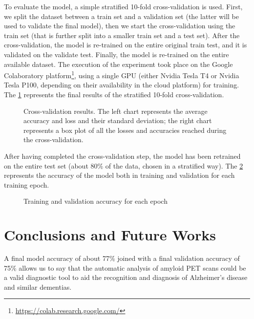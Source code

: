 \documentclass[10pt,twocolumn,letterpaper]{article}
\begin{document}
To evaluate the model, a simple stratified 10-fold cross-validation is used.
First, we split the dataset between a train set and a validation set (the latter
will be used to validate the final model), then we start the cross-validation
using the train set (that is further split into a smaller train set and a test
set). After the cross-validation, the model is re-trained on the entire original
train test, and it is validated on the validate test. Finally, the model is
re-trained on the entire available dataset. The execution of the experiment took
place on the Google Colaboratory
platform\footnote{\url{https://colab.research.google.com/}}, using a single GPU
(either Nvidia Tesla T4 or Nvidia Tesla P100, depending on their availability in
the cloud platform) for training. The \cref{fig:cv-results} represents the final
results of the stratified 10-fold cross-validation.

\begin{figure}[h]
  \centering
  \resizebox{\linewidth}{!}{%
    
  }
  \caption[Cross-validation results]{Cross-validation results. The left chart represents the average accuracy and loss and their standard deviation; the right chart represents a box plot of all the losses and accuracies reached during the cross-validation.}
  \label{fig:cv-results}
\end{figure}

After having completed the cross-validation step, the model has been retrained on the entire test set (about 80\% of the data, chosen in a stratified way). The \cref{fig:validation-accuracy} represents the accuracy of the model both in training and validation for each training epoch.

\begin{figure}[h]
  \centering
  \resizebox{\linewidth}{!}{%
    
  }
  \caption{Training and validation accuracy for each epoch}
  \label{fig:validation-accuracy}
\end{figure}

\section{Conclusions and Future Works}
\label{sec:conclusions}

A final model accuracy of about 77\% joined with a final validation accuracy of
75\% allows us to say that the automatic analysis of amyloid PET scans could be
a valid diagnostic tool to aid the recognition and diagnosis of Alzheimer's
disease and similar dementias.
\end{document}
